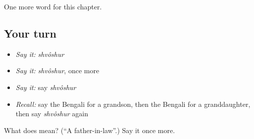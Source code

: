 \begin{grammarlens}[title={What you've built}]
One more word for this chapter.
\end{grammarlens}

\subsection*{Your turn}
\begin{itemize}
\raggedright
  \item \emph{Say it:} \emph{shvôshur}
  \item \emph{Say it:} \emph{shvôshur}, once more
  \item \emph{Say it:} say \emph{shvôshur}
  \item \emph{Recall:} say the Bengali for a grandson, then the Bengali for a granddaughter, then say \emph{shvôshur} again
\end{itemize}

\begin{tcolorbox}[breakable,colback=teal!4,colframe=teal!35!black,title={Before you move on}]
What does  mean? (\textquotedblleft{}A father-in-law\textquotedblright{}.) Say it once more.
\end{tcolorbox}
